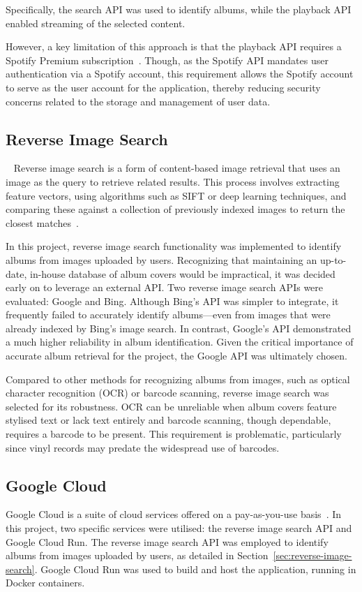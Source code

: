 Specifically, the search API was used to identify albums, while the playback API enabled streaming of the selected content.

However, a key limitation of this approach is that the playback API requires a Spotify Premium subscription~\cite{SpotifyPlaybackSDK}. Though, as the Spotify API mandates user authentication via a Spotify account, this requirement allows the Spotify account to serve as the user account for the application, thereby reducing security concerns related to the storage and management of user data.

\subsection{Reverse Image Search}~\label{sec:reverse-image-search}
Reverse image search is a form of content-based image retrieval that uses an image as the query to retrieve related results. This process involves extracting feature vectors, using algorithms such as SIFT or deep learning techniques, and comparing these against a collection of previously indexed images to return the closest matches~\cite{Gaillard2017LargeSR}.

In this project, reverse image search functionality was implemented to identify albums from images uploaded by users. Recognizing that maintaining an up-to-date, in-house database of album covers would be impractical, it was decided early on to leverage an external API. Two reverse image search APIs were evaluated: Google and Bing. Although Bing's API was simpler to integrate, it frequently failed to accurately identify albums—even from images that were already indexed by Bing's image search. In contrast, Google's API demonstrated a much higher reliability in album identification. Given the critical importance of accurate album retrieval for the project, the Google API was ultimately chosen.

Compared to other methods for recognizing albums from images, such as optical character recognition (OCR) or barcode scanning, reverse image search was selected for its robustness. OCR can be unreliable when album covers feature stylised text or lack text entirely and barcode scanning, though dependable, requires a barcode to be present. This requirement is problematic, particularly since vinyl records may predate the widespread use of barcodes.

\subsection{Google Cloud}
Google Cloud is a suite of cloud services offered on a pay-as-you-use basis~\cite{GCP}. In this project, two specific services were utilised: the reverse image search API and Google Cloud Run. The reverse image search API was employed to identify albums from images uploaded by users, as detailed in Section~\ref{sec:reverse-image-search}. Google Cloud Run was used to build and host the application, running in Docker containers.

